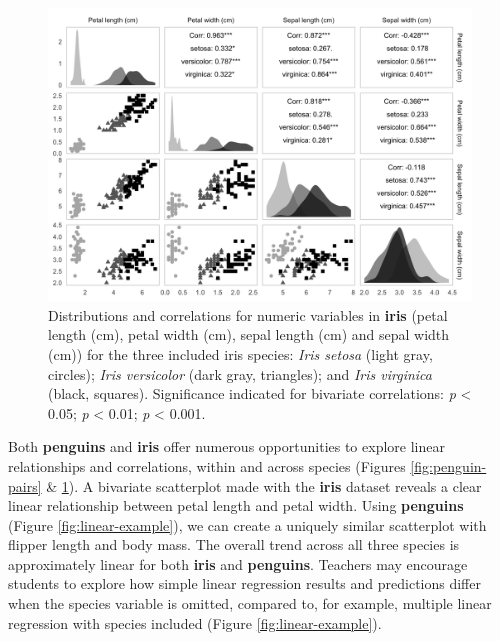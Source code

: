 \begin{Schunk}
\begin{figure}

{\centering \includegraphics[width=\textwidth]{figs/iris-pairs-1} 

}

\caption{Distributions and correlations for numeric variables in \textbf{iris} (petal length (cm), petal width (cm), sepal length (cm) and sepal width (cm)) for the three included iris species: \textit{Iris setosa} (light gray, circles); \textit{Iris versicolor} (dark gray, triangles); and \textit{Iris virginica} (black, squares). Significance indicated for bivariate correlations: \text{*}\textit{p} < 0.05; \text{*}\text{*}\textit{p} < 0.01; \text{*}\text{*}\text{*}\textit{p} < 0.001.}\label{fig:iris-pairs}
\end{figure}
\end{Schunk}

Both \textbf{penguins} and \textbf{iris} offer numerous opportunities to
explore linear relationships and correlations, within and across species
(Figures \ref{fig:penguin-pairs} \& \ref{fig:iris-pairs}). A bivariate
scatterplot made with the \textbf{iris} dataset reveals a clear linear
relationship between petal length and petal width. Using
\textbf{penguins} (Figure \ref{fig:linear-example}), we can create a
uniquely similar scatterplot with flipper length and body mass. The
overall trend across all three species is approximately linear for both
\textbf{iris} and \textbf{penguins}. Teachers may encourage students to
explore how simple linear regression results and predictions differ when
the species variable is omitted, compared to, for example, multiple
linear regression with species included (Figure
\ref{fig:linear-example}).

